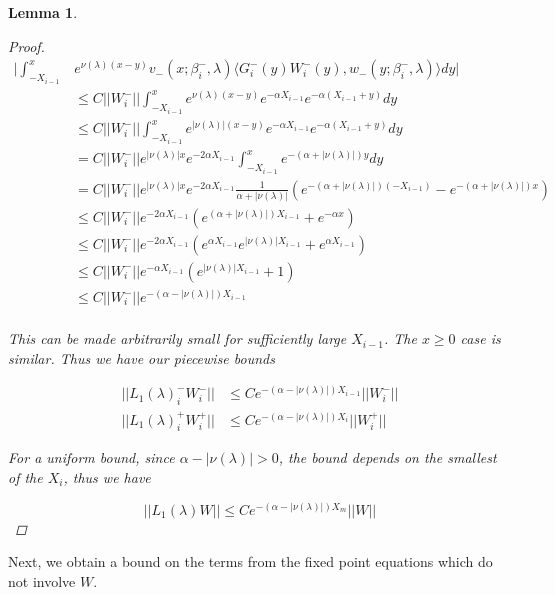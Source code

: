 \documentclass[12pt]{article}
\newtheorem{lemma}{Lemma}
\begin{document}
\begin{lemma}
\begin{proof}
\begin{align*}
\Big| \int_{-X_{i-1}}^x &e^{\nu(\lambda)(x-y)} v_-(x; \beta_i^-, \lambda) \langle G_i^-(y)W_i^-(y), w_-(y; \beta_i^-, \lambda) \rangle dy \Big| \\
&\leq C ||W_i^-|| \int_{-X_{i-1}}^x e^{\nu(\lambda)(x-y)} e^{-\alpha X_{i-1}}e^{-\alpha(X_{i-1} + y)}dy \\
&\leq C ||W_i^-|| \int_{-X_{i-1}}^x e^{|\nu(\lambda)| (x-y)} e^{-\alpha X_{i-1}}e^{-\alpha(X_{i-1} + y)}dy \\
&= C ||W_i^-|| e^{|\nu(\lambda)| x } e^{-2 \alpha X_{i-1}} \int_{-X_{i-1}}^x e^{-(\alpha + |\nu(\lambda)|) y} dy \\
&= C ||W_i^-|| e^{|\nu(\lambda)| x } e^{-2 \alpha X_{i-1}} \frac{1}{\alpha + |\nu(\lambda)|} \left( e^{-(\alpha + |\nu(\lambda)|)(-X_{i-1})} - e^{-(\alpha + |\nu(\lambda)|)x} \right) \\
&\leq C ||W_i^-|| e^{-2 \alpha X_{i-1}} \left( e^{(\alpha + |\nu(\lambda)|)X_{i-1}} + e^{-\alpha x}  \right) \\
&\leq C ||W_i^-|| e^{-2 \alpha X_{i-1}} \left( e^{\alpha X_{i-1}} e^{|\nu(\lambda)|X_{i-1}} + e^{\alpha X_{i-1}}  \right) \\
&\leq C ||W_i^-|| e^{-\alpha X_{i-1}} \left( e^{|\nu(\lambda)|X_{i-1}} + 1 \right) \\
&\leq C ||W_i^-|| e^{-(\alpha -|\nu(\lambda)|)X_{i-1}} \\
\end{align*}

This can be made arbitrarily small for sufficiently large $X_{i-1}$. The $x \geq 0$ case is similar. Thus we have our piecewise bounds

\begin{align*}
||L_1(\lambda)_i^- W_i^-|| &\leq C e^{-(\alpha -|\nu(\lambda)|)X_{i-1}} ||W_i^-|| \\
||L_1(\lambda)_i^+ W_i^+|| &\leq C e^{-(\alpha -|\nu(\lambda)|)X_i} ||W_i^+||
\end{align*}

For a uniform bound, since $\alpha -|\nu(\lambda)| > 0$, the bound depends on the smallest of the $X_i$, thus we have

\[
||L_1(\lambda)W|| \leq C e^{-(\alpha -|\nu(\lambda)|)X_m}||W||
\]

\end{proof}
\end{lemma}

Next, we obtain a bound on the terms from the fixed point equations which do not involve $W$. 
\end{document}
